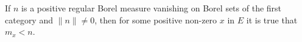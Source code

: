 If $n$ is a positive regular Borel measure vanishing on Borel sets of the first category and $\|n\| \neq 0$, then for some positive non-zero $x$ in $E$ it is true that $m_x < n$.
